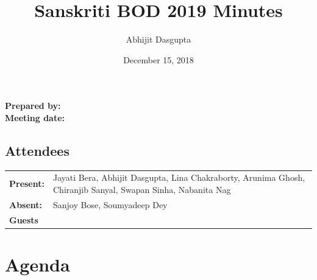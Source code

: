 \documentclass[12pt,]{article}
\title{Sanskriti BOD 2019 Minutes}
\author{Abhijit Dasgupta}
\date{December 15, 2018}
\makeatletter
\renewcommand{\maketitle}{\bgroup\setlength{\parindent}{0pt}
\begin{flushleft}
  \textbf{Prepared by:} \@author\\
  \textbf{Meeting date:} \@date
\end{flushleft}\egroup
}
\makeatother
\begin{document}
\maketitle

\thispagestyle{style1}

{
\setcounter{tocdepth}{4}
\tableofcontents
}
\hypertarget{attendees}{%
\subsection{Attendees}\label{attendees}}

\begin{longtable}[]{@{}ll@{}}
\toprule
\endhead
\begin{minipage}[t]{0.09\columnwidth}\raggedright
\textbf{Present:}\strut
\end{minipage} & \begin{minipage}[t]{0.85\columnwidth}\raggedright
Jayati Bera, Abhijit Dasgupta, Lina Chakraborty, Arunima Ghosh,
Chiranjib Sanyal, Swapan Sinha, Nabanita Nag\strut
\end{minipage}\tabularnewline
\begin{minipage}[t]{0.09\columnwidth}\raggedright
\textbf{Absent:}\strut
\end{minipage} & \begin{minipage}[t]{0.85\columnwidth}\raggedright
Sanjoy Bose, Soumyadeep Dey\strut
\end{minipage}\tabularnewline
\begin{minipage}[t]{0.09\columnwidth}\raggedright
\textbf{Guests}\strut
\end{minipage} & \begin{minipage}[t]{0.85\columnwidth}\raggedright
\strut
\end{minipage}\tabularnewline
\bottomrule
\end{longtable}

\newpage

\hypertarget{agenda}{%
\section{Agenda}\label{agenda}}
\end{document}
